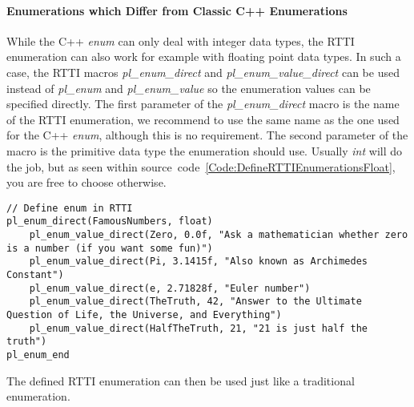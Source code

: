 \paragraph{Enumerations which Differ from Classic C++ Enumerations}
While the C++ \emph{enum} can only deal with integer data types, the \ac{RTTI} enumeration can also work for example with floating point data types. In such a case, the \ac{RTTI} macros \emph{pl\_enum\_direct} and \emph{pl\_enum\_value\_direct} can be used instead of \emph{pl\_enum} and \emph{pl\_enum\_value} so the enumeration values can be specified directly. The first parameter of the \emph{pl\_enum\_direct} macro is the name of the \ac{RTTI} enumeration, we recommend to use the same name as the one used for the C++ \emph{enum}, although this is no requirement. The second parameter of the macro is the primitive data type the enumeration should use. Usually \emph{int} will do the job, but as seen within source~code~\ref{Code:DefineRTTIEnumerationsFloat}, you are free to choose otherwise.
\begin{lstlisting}[label=Code:DefineRTTIEnumerationsFloat,caption={Defining \ac{RTTI} enumerations which differ from classic C++ enumerations}]
// Define enum in RTTI
pl_enum_direct(FamousNumbers, float)
	pl_enum_value_direct(Zero, 0.0f, "Ask a mathematician whether zero is a number (if you want some fun)")
	pl_enum_value_direct(Pi, 3.1415f, "Also known as Archimedes Constant")
	pl_enum_value_direct(e, 2.71828f, "Euler number")
	pl_enum_value_direct(TheTruth, 42, "Answer to the Ultimate Question of Life, the Universe, and Everything")
	pl_enum_value_direct(HalfTheTruth, 21, "21 is just half the truth")
pl_enum_end
\end{lstlisting}
The defined \ac{RTTI} enumeration can then be used just like a traditional enumeration.


